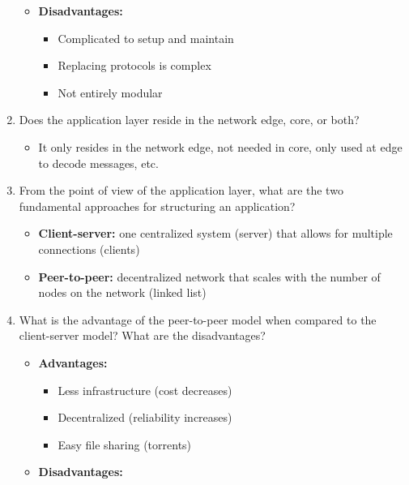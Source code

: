 \documentclass{article}
\begin{document}
\begin{enumerate}
\begin{itemize}
\item \textbf{Disadvantages:}

\begin{itemize}
\item Complicated to setup and maintain
\item Replacing protocols is complex
\item Not entirely modular
\end{itemize}

\end{itemize}

\item Does the application layer reside in the network edge, core, or both?

\begin{itemize}
\item It only resides in the network edge, not needed in core, only used at edge to decode messages, etc.
\end{itemize}

\item From the point of view of the application layer, what are the two fundamental approaches for structuring an application?

\begin{itemize}
\item \textbf{Client-server:} one centralized system (server) that allows for multiple connections (clients)
\item \textbf{Peer-to-peer:} decentralized network that scales with the number of nodes on the network (linked list)
\end{itemize}

\newpage

\item What is the advantage of the peer-to-peer model when compared to the client-server model? What are the disadvantages?

\begin{itemize}
\item \textbf{Advantages:}

\begin{itemize}
\item Less infrastructure (cost decreases)
\item Decentralized (reliability increases)
\item Easy file sharing (torrents)
\end{itemize}

\item \textbf{Disadvantages:}


\end{itemize}
\end{enumerate}
\end{document}
